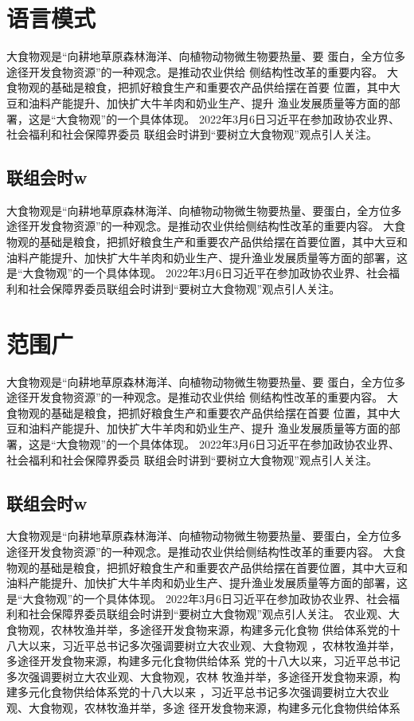 	\section{语言模式}
	大食物观是“向耕地草原森林海洋、向植物动物微生物要热量、要
	蛋白，全方位多途径开发食物资源”的一种观念。是推动农业供给
	侧结构性改革的重要内容。
大食物观的基础是粮食，把抓好粮食生产和重要农产品供给摆在首要
位置，其中大豆和油料产能提升、加快扩大牛羊肉和奶业生产、提升
渔业发展质量等方面的部署，这是“大食物观”的一个具体体现。
2022年3月6日习近平在参加政协农业界、社会福利和社会保障界委员
联组会时讲到“要树立大食物观”观点引人关注。
\subsection{联组会时w}
大食物观是“向耕地草原森林海洋、向植物动物微生物要热量、要蛋白，全方位多途径开发食物资源”的一种观念。是推动农业供给侧结构性改革的重要内容。
大食物观的基础是粮食，把抓好粮食生产和重要农产品供给摆在首要位置，其中大豆和油料产能提升、加快扩大牛羊肉和奶业生产、提升渔业发展质量等方面的部署，这是“大食物观”的一个具体体现。
2022年3月6日习近平在参加政协农业界、社会福利和社会保障界委员联组会时讲到“要树立大食物观”观点引人关注。
\section{范围广}
大食物观是“向耕地草原森林海洋、向植物动物微生物要热量、要
蛋白，全方位多途径开发食物资源”的一种观念。是推动农业供给
侧结构性改革的重要内容。
大食物观的基础是粮食，把抓好粮食生产和重要农产品供给摆在首要
位置，其中大豆和油料产能提升、加快扩大牛羊肉和奶业生产、提升
渔业发展质量等方面的部署，这是“大食物观”的一个具体体现。
2022年3月6日习近平在参加政协农业界、社会福利和社会保障界委员
联组会时讲到“要树立大食物观”观点引人关注。
\subsection{联组会时w}
大食物观是“向耕地草原森林海洋、向植物动物微生物要热量、要蛋白，全方位多途径开发食物资源”的一种观念。是推动农业供给侧结构性改革的重要内容。
大食物观的基础是粮食，把抓好粮食生产和重要农产品供给摆在首要位置，其中大豆和油料产能提升、加快扩大牛羊肉和奶业生产、提升渔业发展质量等方面的部署，这是“大食物观”的一个具体体现。
2022年3月6日习近平在参加政协农业界、社会福利和社会保障界委员联组会时讲到“要树立大食物观”观点引人关注。
农业观、大食物观，农林牧渔并举，多途径开发食物来源，构建多元化食物
供给体系党的十八大以来，习近平总书记多次强调要树立大农业观、大食物观
，农林牧渔并举，多途径开发食物来源，构建多元化食物供给体系
党的十八大以来，习近平总书记多次强调要树立大农业观、大食物观，农林
牧渔并举，多途径开发食物来源，构建多元化食物供给体系党的十八大以来
，习近平总书记多次强调要树立大农业观、大食物观，农林牧渔并举，多途
径开发食物来源，构建多元化食物供给体系	

